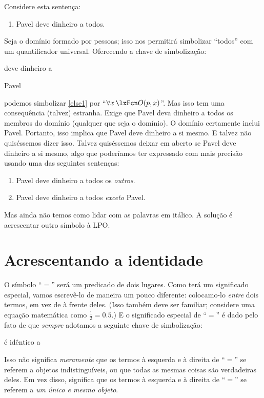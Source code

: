Considere esta sentença:
\begin{enumerate}
\item\label{else1} Pavel deve dinheiro a todos.
\end{enumerate}
Seja o domínio formado por pessoas; isso nos permitirá simbolizar \textquotedblleft todos\textquotedblright{} com um quantificador universal. Oferecendo a chave de simbolização:
	\begin{ekey}
\item[\atom{O}{x,y}]  deve dinheiro a 
		\item[p] Pavel
	\end{ekey}
podemos simbolizar \cref*{else1} por \textquotedblleft $\forall x\, \atom{O}{p,x}$\textquotedblright{}. Mas isso tem uma consequência (talvez) estranha. Exige que Pavel deva dinheiro a todos os membros do domínio (qualquer que seja o domínio). O domínio certamente inclui Pavel. Portanto, isso implica que Pavel deve dinheiro a si mesmo. E talvez não quiséssemos dizer isso. Talvez quiséssemos deixar em aberto se Pavel deve dinheiro a si mesmo, algo que poderíamos ter expressado com mais precisão usando uma das seguintes sentenças:
	\begin{enumerate}
\item\label{else1b} Pavel deve dinheiro a todos os \emph{outros}.
\item\label{else1c} Pavel deve dinheiro a todos \emph{exceto} Pavel.
	\end{enumerate}
Mas ainda não temos como lidar com as palavras em itálico. A solução é acrescentar outro símbolo à LPO.

\section{Acrescentando a identidade}

O símbolo \textquotedblleft $=$\textquotedblright{} será um predicado de dois lugares. Como terá um significado especial, vamos escrevê-lo de maneira um pouco diferente: colocamo-lo \emph{entre} dois termos, em vez de à frente deles. (Isso também deve ser familiar; considere uma equação matemática como $\frac{1}{2} = 0.5$.) E o significado especial de \textquotedblleft $=$\textquotedblright{} é dado pelo fato de que \emph{sempre} adotamos a seguinte chave de simbolização:
	\begin{ekey}
\item[{x=y}]  é idêntico a 
	\end{ekey}
Isso não significa \emph{meramente} que os termos à esquerda e à direita de \textquotedblleft $=$\textquotedblright{} se referem a objetos indistinguíveis, ou que todas as mesmas coisas são verdadeiras deles. Em vez disso, significa que os termos à esquerda e à direita de \textquotedblleft $=$\textquotedblright{} se referem a \emph{um único e mesmo objeto}.




